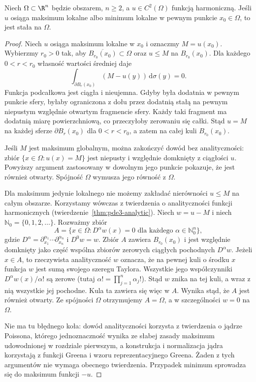 \begin{twierdzenie}
\label{thm:pde3-strong-max}
Niech $\Omega\subset\R^n$ będzie obszarem, $n\geq2$,
a $u\in C^2(\Omega)$ funkcją harmoniczną. Jeśli
$u$ osiąga maksimum lokalne albo minimum lokalne w pewnym
punkcie $x_0\in\Omega$, to jest stała na $\Omega$.
\end{twierdzenie}
\begin{proof}
Niech $u$ osiąga maksimum lokalne w $x_0$ i oznaczmy
$M=u(x_0)$. Wybierzmy $r_0>0$ tak, aby
$\overline{B_{r_0}(x_0)}\subset\Omega$ oraz $u\leq M$
na $B_{r_0}(x_0)$. Dla każdego $0<r<r_0$ własność
wartości średniej daje
\[
 \int_{\partial B_r(x_0)}(M-u(y))\,\mathrm d\sigma(y)=0.
\]
Funkcja podcałkowa jest ciągła i nieujemna.
Gdyby była dodatnia w pewnym punkcie sfery,
byłaby ograniczona z dołu przez dodatnią stałą
na pewnym niepustym względnie otwartym fragmencie
sfery. Każdy taki fragment ma dodatnią miarę
powierzchniową, co przeczyłoby zerowaniu się całki.
Stąd $u=M$ na każdej sferze $\partial B_r(x_0)$
dla $0<r<r_0$, a zatem na całej kuli $B_{r_0}(x_0)$.

Jeśli $M$ jest maksimum globalnym, można zakończyć
dowód bez analityczności: zbiór $\{x\in\Omega:u(x)=M\}$
jest niepusty i względnie domknięty z ciągłości $u$.
Powyższy argument zastosowany w dowolnym jego punkcie
pokazuje, że jest również otwarty. Spójność $\Omega$
wymusza jego równość z $\Omega$.

Dla maksimum jedynie lokalnego nie możemy zakładać
nierówności $u\leq M$ na całym obszarze.
Korzystamy wówczas z twierdzenia o analityczności
funkcji harmonicznych (twierdzenie~\ref{thm:pde3-analytic}).
Niech $w=u-M$ i niech $\mathbb N_0=\{0,1,2,\ldots\}$.
Rozważmy zbiór
\[
 A=\{x\in\Omega:D^\alpha w(x)=0
       \text{ dla każdego }\alpha\in\mathbb N_0^n\},
\]
gdzie $D^\alpha=\partial_{x_1}^{\alpha_1}\cdots
\partial_{x_n}^{\alpha_n}$ i $D^0w=w$.
Zbiór $A$ zawiera $B_{r_0}(x_0)$ i jest względnie
domknięty jako część wspólna zbiorów zerowych
ciągłych pochodnych $D^\alpha w$.
Jeżeli $x\in A$, to rzeczywista analityczność $w$
oznacza, że na pewnej kuli o środku $x$ funkcja $w$
jest sumą swojego szeregu Taylora. Wszystkie jego
współczynniki $D^\alpha w(x)/\alpha!$ są zerowe
(tutaj $\alpha!=\prod_{j=1}^n\alpha_j!$).
Stąd $w$ znika na tej kuli, a wraz z nią wszystkie
jej pochodne. Kula ta zawiera się więc w $A$.
Wynika stąd, że $A$ jest również otwarty.
Ze spójności $\Omega$ otrzymujemy $A=\Omega$,
a w szczególności $w=0$ na $\Omega$.

Nie ma tu błędnego koła: dowód analityczności korzysta
z twierdzenia o jądrze Poissona, którego jednoznaczność
wynika ze słabej zasady maksimum udowodnionej w rozdziale
pierwszym, a konstrukcja i normalizacja jądra korzystają
z funkcji Greena i wzoru reprezentacyjnego Greena.
Żaden z tych argumentów nie wymaga obecnego twierdzenia.
Przypadek minimum sprowadza się do maksimum funkcji $-u$.
\end{proof}

